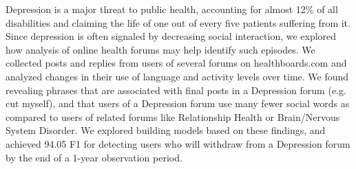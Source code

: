 Depression is a major threat to public health, accounting for almost 12\% of all disabilities and claiming the life of one out of every five patients suffering from it. Since depression is often signaled by decreasing social interaction, we explored how analysis of online health forums may help identify such episodes. We collected posts and replies from users of several forums on healthboards.com and analyzed changes in their use of language and activity levels over time. We found revealing phrases that are associated with final posts in a Depression forum (e.g. cut myself), and that users of a Depression forum use many fewer social words as compared to users of related forums like Relationship Health or Brain/Nervous System Disorder. We explored building models based on these findings, and achieved 94.05 F1 for detecting users who will withdraw from a Depression forum by the end of a 1-year observation period.
